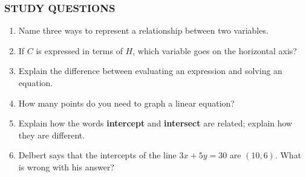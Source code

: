 \documentclass[10pt,]{book}
\newcommand{\terminology}[1]{\textbf{#1}}
\theoremstyle{plain}
\theoremstyle{definition}
\theoremstyle{definition}
\theoremstyle{definition}
\numberwithin{equation}{part}
\begin{document}
\subsubsection[{STUDY QUESTIONS}]{STUDY QUESTIONS}\label{subsubsection-3}
\leavevmode%
\begin{enumerate}[label=\arabic*]
\item\hypertarget{li-97}{}Name three ways to represent a relationship between two variables.%
\item\hypertarget{li-98}{}If \(C\) is expressed in terms of \(H\), which variable goes on the horizontal axis?%
\item\hypertarget{li-99}{}Explain the difference between evaluating an expression and solving an equation.%
\item\hypertarget{li-100}{}How many points do you need to graph a linear equation?%
\item\hypertarget{li-101}{}Explain how the words \terminology{intercept} and \terminology{intersect} are related; explain how they are different.%
\item\hypertarget{li-102}{}Delbert says that the intercepts of the line \(3x + 5y = 30\) are \((10, 6)\). What is wrong with his answer?%
\end{enumerate}
%
\typeout{************************************************}
\typeout{************************************************}
\end{document}
